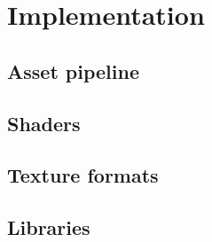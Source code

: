 \section{Implementation} \label{implementation}
\subsection{Asset pipeline} \label{implementation:asset_pipeline}
\subsection{Shaders} \label{implementation:shaders}
\subsection{Texture formats} \label{implementation:texture_formats}
\subsection{Libraries} \label{implementation:libraries}